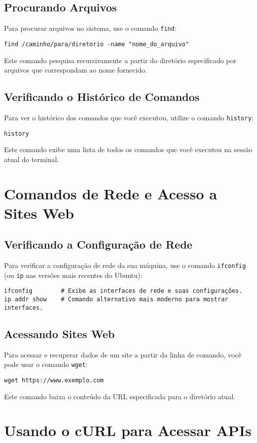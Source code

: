 \subsection{Procurando Arquivos}
Para procurar arquivos no sistema, use o comando \texttt{find}:
\begin{verbatim}
find /caminho/para/diretorio -name "nome_do_arquivo"
\end{verbatim}
Este comando pesquisa recursivamente a partir do diretório especificado por arquivos que correspondam ao nome fornecido.

\subsection{Verificando o Histórico de Comandos}
Para ver o histórico dos comandos que você executou, utilize o comando \texttt{history}:
\begin{verbatim}
history
\end{verbatim}
Este comando exibe uma lista de todos os comandos que você executou na sessão atual do terminal.

\section{Comandos de Rede e Acesso a Sites Web}

\subsection{Verificando a Configuração de Rede}
Para verificar a configuração de rede da sua máquina, use o comando \texttt{ifconfig} (ou \texttt{ip} nas versões mais recentes do Ubuntu):
\begin{verbatim}
ifconfig        # Exibe as interfaces de rede e suas configurações.
ip addr show    # Comando alternativo mais moderno para mostrar interfaces.
\end{verbatim}

\subsection{Acessando Sites Web}
Para acessar e recuperar dados de um site a partir da linha de comando, você pode usar o comando \texttt{wget}:
\begin{verbatim}
wget https://www.exemplo.com
\end{verbatim}
Este comando baixa o conteúdo da URL especificada para o diretório atual.

\section{Usando o cURL para Acessar APIs}

